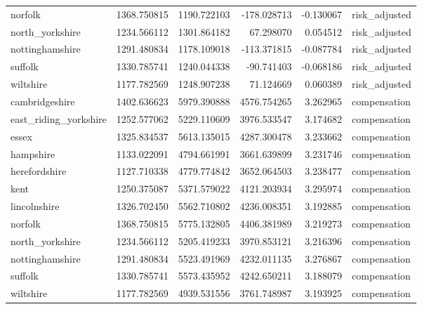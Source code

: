\begin{tabular}{lrrrrl}
norfolk & 1368.750815 & 1190.722103 & -178.028713 & -0.130067 & risk\_adjusted \\
north\_yorkshire & 1234.566112 & 1301.864182 & 67.298070 & 0.054512 & risk\_adjusted \\
nottinghamshire & 1291.480834 & 1178.109018 & -113.371815 & -0.087784 & risk\_adjusted \\
suffolk & 1330.785741 & 1240.044338 & -90.741403 & -0.068186 & risk\_adjusted \\
wiltshire & 1177.782569 & 1248.907238 & 71.124669 & 0.060389 & risk\_adjusted \\
cambridgeshire & 1402.636623 & 5979.390888 & 4576.754265 & 3.262965 & compensation \\
east\_riding\_yorkshire & 1252.577062 & 5229.110609 & 3976.533547 & 3.174682 & compensation \\
essex & 1325.834537 & 5613.135015 & 4287.300478 & 3.233662 & compensation \\
hampshire & 1133.022091 & 4794.661991 & 3661.639899 & 3.231746 & compensation \\
herefordshire & 1127.710338 & 4779.774842 & 3652.064503 & 3.238477 & compensation \\
kent & 1250.375087 & 5371.579022 & 4121.203934 & 3.295974 & compensation \\
lincolnshire & 1326.702450 & 5562.710802 & 4236.008351 & 3.192885 & compensation \\
norfolk & 1368.750815 & 5775.132805 & 4406.381989 & 3.219273 & compensation \\
north\_yorkshire & 1234.566112 & 5205.419233 & 3970.853121 & 3.216396 & compensation \\
nottinghamshire & 1291.480834 & 5523.491969 & 4232.011135 & 3.276867 & compensation \\
suffolk & 1330.785741 & 5573.435952 & 4242.650211 & 3.188079 & compensation \\
wiltshire & 1177.782569 & 4939.531556 & 3761.748987 & 3.193925 & compensation \\
\bottomrule
\end{tabular}
